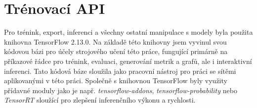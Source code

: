 \section{Trénovací API}
\label{sec:Chapter52}
Pro trénink, export, inferenci a všechny ostatní manipulace s modely byla použita knihovna TensorFlow 2.13.0. Na základě této knihovny jsem vyvinul svou kódovou bázi pro účely strojového učení této práce, fungující primárně na příkazové řádce pro trénink, evaluaci, generování metrik a grafů, ale i interaktivní inferenci. Tato kódová báze sloužila jako pracovní nástroj pro práci se sítěmi aplikovanými v této práci. Společně s knihovnou TensorFlow byly využity přídavné moduly jako je např. \textit{tensorflow-addons}, \textit{tensorflow-probability} \cite{tensorflow_libs} nebo \textit{TensorRT} \cite{tensorrt_docs} sloužící pro zlepšení inferenčního výkonu a rychlosti.
\endinput